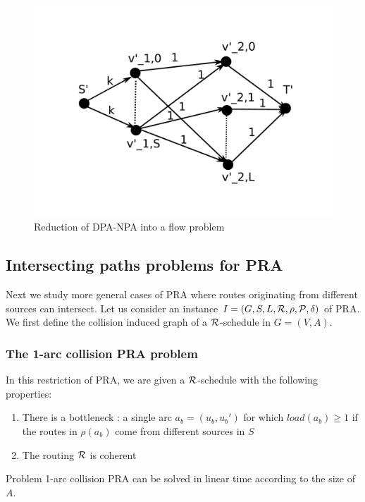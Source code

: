 \documentclass{article}
\newcommand\rschedule{$\cal R$-schedule\xspace}
\begin{document}
\begin{figure}[!t]
\centering
\includegraphics[scale=0.3]{DP-NPA.pdf}
\caption{Reduction of DPA-NPA into a flow problem}
\label{Modelling of DP-NPA Problem}
\end{figure}


\subsection{Intersecting paths problems for PRA}

Next we study more general cases of PRA where routes originating from different sources can intersect. Let us consider an instance $I= (G, S, L, \cal R, \rho, P, \delta)$ of PRA. We first define the collision induced graph of a \rschedule in $G=(V,A)$.


\subsubsection{The 1-arc collision PRA problem}

In this restriction of PRA, we are given a \rschedule with the following properties:
\begin{enumerate}
\item There is a bottleneck : a single arc $a_b=(u_b, u_b')$ for which $load(a_b) \geq 1$ if the routes in $\rho(a_b)$ come from different sources in $S$
\item The routing $\cal R$ is coherent 
\end{enumerate}

\begin{proposition}
\label{1-arc PRA}
Problem 1-arc collision PRA can be solved in linear time according to the size of $A$.

\end{proposition}
\end{document}
